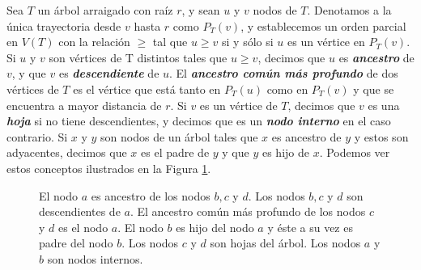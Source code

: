 Sea $T$ un árbol arraigado con raíz $r$, y sean $u$ y $v$ nodos de $T$. Denotamos a la única trayectoria desde $v$ hasta $r$ como $P_T(v)$, y establecemos un orden parcial en $V(T)$ con la relación $\geq$ tal que $u \geq v$ si y sólo si $u$ es un vértice en $P_T(v)$. Si $u$ y $v$ son vértices de T distintos tales que $u \geq v$, decimos que $u$ es \textbf{\emph{ancestro}} de $v$, y que $v$ es \textbf{\emph{descendiente}} de $u$. El \textbf{\emph{ancestro común más profundo}} de dos vértices de $T$ es el vértice que está tanto en $P_T(u)$ como en $P_T(v)$ y que se encuentra a mayor distancia de $r$. Si $v$ es un vértice de $T$, decimos que $v$ es una \textbf{\emph{hoja}} si no tiene descendientes, y decimos que es un \textbf{\emph{nodo interno}} en el caso contrario. Si $x$ y $y$ son nodos de un árbol tales que $x$ es ancestro de $y$ y estos son adyacentes, decimos que $x$ es el padre de $y$ y que $y$ es hijo de $x$. Podemos ver estos conceptos ilustrados en la Figura \ref{fig_ejemplo_arbol_2}.

\begin{figure}[!htbp]
\centering
\begin{subfigure}{\textwidth}
\centering
{}
\end{subfigure}
\caption{El nodo $a$ es ancestro de los nodos $b,c $ y $d$. Los nodos $b,c $ y $d$ son descendientes de $a$. El ancestro común más profundo de los nodos $c$ y $d$ es el nodo $a$. El nodo $b$ es hijo del nodo $a$ y éste a su vez es padre del nodo $b$. Los nodos $c$ y $d$ son hojas del árbol. Los nodos $a$ y $b$ son nodos internos.}
\label{fig_ejemplo_arbol_2}
\end{figure}




